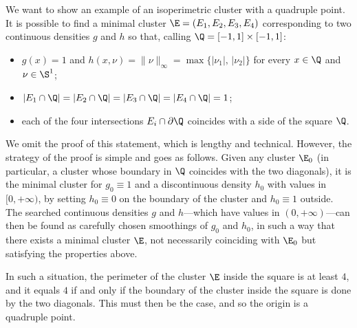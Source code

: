 \begin{example}\label{exL1}
We want to show an example of an isoperimetric cluster with a quadruple point. It is possible to find a minimal cluster $\E=(E_1,E_2,E_3,E_4)$ corresponding to two continuous densities $g$ and $h$ so that, calling $\Q=[-1,1]\times [-1,1]$:
\begin{itemize}
\item $g(x)=1$ and $h(x,\nu) = \|\nu\|_\infty=\max\{|\nu_1|,\,|\nu_2|\}$ for every $x\in \Q$ and $\nu\in\S^1$;
\item $|E_1\cap \Q|= |E_2\cap \Q|=|E_3\cap \Q|=|E_4\cap \Q|=1$;
\item each of the four intersections $E_i \cap\partial \Q$ coincides with a side of the square $\Q$.
\end{itemize}
We omit the proof of this statement, which is lengthy and technical. However, the strategy of the proof is simple and goes as follows. Given any cluster $\E_0$ (in particular, a cluster whose boundary in $\Q$ coincides with the two diagonals), it is the minimal cluster for $g_0\equiv 1$ and a discontinuous density $h_0$ with values in $[0,+\infty)$, by setting $h_0\equiv 0$ on the boundary of the cluster and $h_0\equiv 1$ outside. The searched continuous densities $g$ and $h$---which have values in $(0,+\infty)$---can then be found as carefully chosen smoothings of $g_0$ and $h_0$, in such a way that there exists a minimal cluster $\E$, not necessarily coinciding with $\E_0$ but satisfying the properties above.

In such a situation, the perimeter of the cluster $\E$ inside the square is at least $4$, and it equals $4$ if and only if the boundary of the cluster inside the square is done by the two diagonals. This must then be the case, and so the origin is a quadruple point.
\end{example}


